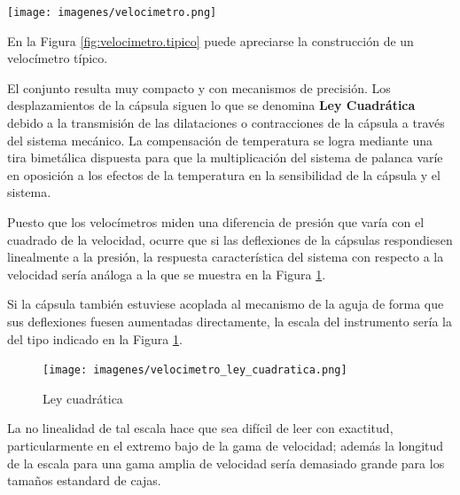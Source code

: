 \documentclass[a4paper,12pt,twoside]{article}
\begin{document}
\begin{minipage}[b]{0.450\linewidth}
    \centering
    \texttt{[image: imagenes/velocimetro.png]}
    \label{fig:velocimetro.tipico}
\end{minipage}
\hspace{0.0250\linewidth}
\begin{minipage}[b]{0.50\linewidth}
  En la Figura \ref{fig:velocimetro.tipico} puede apreciarse la construcción de un velocímetro
  típico.

  El conjunto resulta muy compacto y con mecanismos de precisión. Los
  desplazamientos de la cápsula siguen lo que se denomina \textbf{Ley
    Cuadr\'atica} debido a la transmisión de las dilataciones o
  contracciones de la cápsula a través del sistema mecánico. La
  compensación de temperatura se logra mediante una tira bimetálica
  dispuesta para que la multiplicación del sistema de palanca varíe en
  oposición a los efectos de la temperatura en la sensibilidad de la
  cápsula y el sistema.

Puesto que los velocímetros miden una diferencia de presión que varía con el cuadrado de la velocidad, ocurre que si las deflexiones de la cápsulas respondiesen linealmente a la presión, la respuesta característica del sistema con respecto a la velocidad sería análoga a la que se muestra en la Figura \ref{fig:ley.cuadratica}.

 Si la cápsula también estuviese acoplada al mecanismo de la aguja de forma que sus deflexiones fuesen aumentadas directamente, la escala del instrumento sería la del tipo indicado en la Figura \ref{fig:ley.cuadratica}.

\end{minipage}

\begin{figure}[!h]
  \centering
  \texttt{[image: imagenes/velocimetro\_ley\_cuadratica.png]}
  \caption{Ley cuadr\'atica}
  \label{fig:ley.cuadratica}
\end{figure}


La no linealidad de tal escala hace que sea difícil de leer con exactitud, particularmente en el extremo bajo de la gama de velocidad; además la longitud de la escala para una gama amplia de velocidad sería demasiado grande para los tamaños estandard de cajas.
\end{document}
